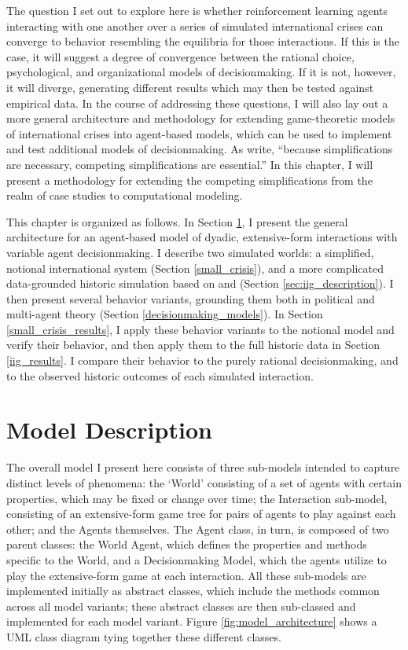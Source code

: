 The question I set out to explore here is whether reinforcement learning agents interacting with one another over a series of simulated international crises can converge to behavior resembling the equilibria for those interactions. If this is the case, it will suggest a degree of convergence between the rational choice, psychological, and organizational models of decisionmaking. If it is not, however, it will diverge, generating different results which may then be tested against empirical data. In the course of addressing these questions, I will also lay out a more general architecture and methodology for extending game-theoretic models of international crises into agent-based models, which can be used to implement and test additional models of decisionmaking. As \citet{allison_1999} write, ``because  simplifications are necessary, competing simplifications are essential.'' In this chapter, I will present a methodology for extending the competing simplifications from the realm of case studies to computational modeling.

This chapter is organized as follows. In Section \ref{description}, I present the general architecture for an agent-based model of dyadic, extensive-form interactions with variable agent decisionmaking. I describe two simulated worlds: a simplified, notional international system (Section \ref{small_crisis}), and a more complicated data-grounded historic simulation based on \citet{bdm_1992} and \citet{bennett_2000} (Section \ref{sec:iig_description}). I then present several behavior variants, grounding them both in political and multi-agent theory (Section \ref{decisionmaking_models}). In Section \ref{small_crisis_results}, I apply these behavior variants to the notional model and verify their behavior, and then apply them to the full historic data in Section \ref{iig_results}. I compare their behavior to the purely rational decisionmaking, and to the observed historic outcomes of each simulated interaction.

\section{Model Description} \label{description}

The overall model I present here consists of three sub-models intended to capture distinct levels of phenomena: the `World' consisting of a set of agents with certain properties, which may be fixed or change over time; the Interaction sub-model, consisting of an extensive-form game tree for pairs of agents to play against each other; and the Agents themselves. The Agent class, in turn, is composed of two parent classes: the World Agent, which defines the properties and methods specific to the World, and a Decisionmaking Model, which the agents utilize to play the extensive-form game at each interaction. All these sub-models are implemented initially as abstract classes, which include the methods common across all model variants; these abstract classes are then sub-classed and implemented for each model variant. Figure \ref{fig:model_architecture} shows a UML class diagram tying together these different classes.

